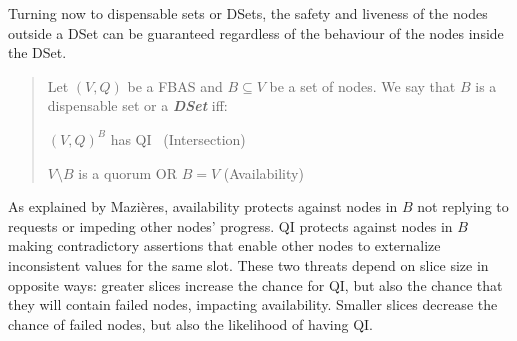 Turning now to dispensable sets or DSets, the safety and liveness of the nodes outside a DSet can  be guaranteed regardless of the behaviour of the nodes inside the DSet.
\begin{quote}
\vspace{-0.6cm}
\small
\begin{defin}
\label{dset}
Let $(V, Q)$ be a FBAS and $B \subseteq V$ be a set of nodes. We say that $B$ is a dispensable set or a \emph{\textbf{DSet}} iff:
\begin{packed_item1}
\item $(V, Q)^B$ has QI \qquad\qquad\qquad\qquad\ (Intersection)
\item $V \setminus B$ is a quorum OR $B = V$ \qquad (Availability)
\end{packed_item1}
\end{defin}
\end{quote}
As explained by Mazi\`eres, availability protects against nodes in $B$ not replying to requests or impeding other nodes' progress. QI protects against nodes in $B$ making contradictory assertions that enable other nodes to externalize inconsistent values for the same slot. These two threats depend on slice size in opposite ways: greater slices increase the chance for QI, but also the chance that they will contain failed nodes, impacting availability. Smaller slices decrease the chance of failed nodes, but also the likelihood of having QI.

